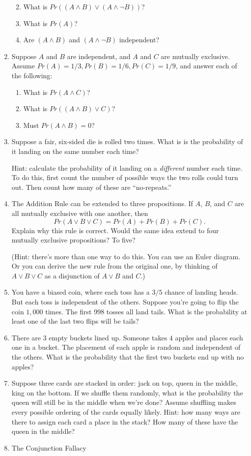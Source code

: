 \documentclass[]{tufte-book}
\providecommand{\tightlist}{%
  \setlength{\itemsep}{0pt}\setlength{\parskip}{0pt}}
\begin{document}
\begin{enumerate}
  \begin{enumerate}
  \def\labelenumii{\alph{enumii}.}
  \tightlist
  \item
    What is \(Pr((A \wedge B) \vee (A \wedge \neg B))\)?
  \item
    What is \(Pr(A)\)?
  \item
    Are \((A \wedge B)\) and \((A \wedge \neg B)\) independent?
  \end{enumerate}
\item
  Suppose \(A\) and \(B\) are independent, and \(A\) and \(C\) are mutually exclusive. Assume \(Pr(A) = 1/3, Pr(B) = 1/6, Pr(C) = 1/9\), and answer each of the following:

  \begin{enumerate}
  \def\labelenumii{\alph{enumii}.}
  \tightlist
  \item
    What is \(Pr(A \wedge C)\)?
  \item
    What is \(Pr((A \wedge B) \vee C)\)?
  \item
    Must \(Pr(A \wedge B) = 0\)?
  \end{enumerate}
\item
  Suppose a fair, six-sided die is rolled two times. What is is the probability of it landing on the same number each time?

  Hint: calculate the probability of it landing on a \emph{different} number each time. To do this, first count the number of possible ways the two rolls could turn out. Then count how many of these are ``no-repeats.''
\item
  The Addition Rule can be extended to three propositions. If \(A\), \(B\), and \(C\) are all mutually exclusive with one another, then
  \[ Pr(A \vee B \vee C) = Pr(A) + Pr(B) + Pr(C).\]
  Explain why this rule is correct. Would the same idea extend to four mutually exclusive propositions? To five?

  (Hint: there's more than one way to do this. You can use an Euler diagram. Or you can derive the new rule from the original one, by thinking of \(A \vee B \vee C\) as a disjunction of \(A \vee B\) and \(C\).)
\item
  You have a biased coin, where each toss has a \(3/5\) chance of landing heads. But each toss is independent of the others. Suppose you're going to flip the coin \(1,000\) times. The first 998 tosses all land tails. What is the probability at least one of the last two flips will be tails?
\item
  There are \(3\) empty buckets lined up. Someone takes \(4\) apples and places each one in a bucket. The placement of each apple is random and independent of the others. What is the probability that the first two buckets end up with no apples?
\item
  Suppose three cards are stacked in order: jack on top, queen in the middle, king on the bottom. If we shuffle them randomly, what is the probability the queen will still be in the middle when we're done? Assume shuffling makes every possible ordering of the cards equally likely. Hint: how many ways are there to assign each card a place in the stack? How many of these have the queen in the middle?
\item
  The Conjunction Fallacy


\end{enumerate}
\end{document}
